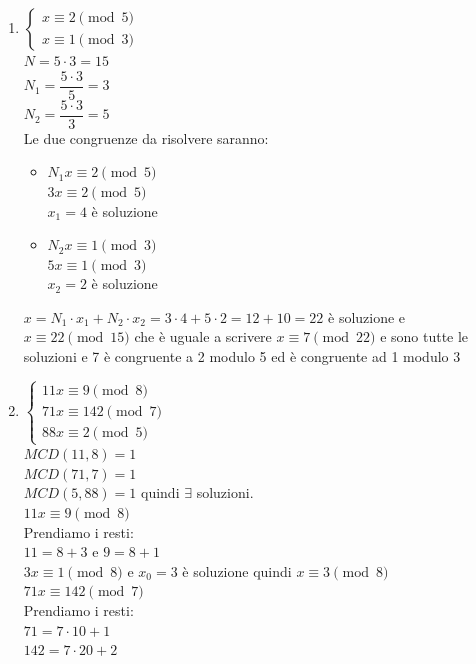 \documentclass[12pt, letterpaper]{report}
\begin{document}
		\begin{enumerate}
			\item $\begin{cases}
				x \equiv 2 \pmod{5} \\
				x \equiv 1 \pmod{3}
			\end{cases}$ \\
			$N = 5 \cdot 3 = 15$ \\
			$N_1 = \dfrac{5 \cdot 3}{5} = 3$ \\
			$N_2 = \dfrac{5 \cdot 3}{3} = 5$ \\
			Le due congruenze da risolvere saranno:
			\begin{itemize}
				\item $N_1x\equiv 2 \pmod{5}$ \\
				$3x \equiv 2 \pmod{5}$ \\
				$x_1 = 4$ è soluzione
				\item $N_2x \equiv 1 \pmod{3}$ \\
				$5x \equiv 1 \pmod{3}$ \\
				$x_2 = 2$ è soluzione
			\end{itemize}
			$x = N_1\cdot x_1 + N_2 \cdot x_2 = 3 \cdot 4 + 5 \cdot 2 = 12 + 10 = 22$ è soluzione e $x \equiv 22 \pmod{15}$ che è uguale a scrivere $x \equiv 7 \pmod{22}$ e sono tutte le soluzioni e 7 è congruente a 2 modulo 5 ed è congruente ad 1 modulo 3
			\item $\begin{cases}
				11x \equiv 9 \pmod{8} \\
				71x \equiv 142 \pmod{7} \\
				88x \equiv 2 \pmod{5}
			\end{cases}$ \\
			$MCD(11, 8) = 1$ \\
			$MCD(71,7) = 1$ \\
			$MCD(5, 88) = 1$ quindi $\exists$ soluzioni. \\
			$11x \equiv 9 \pmod{8}$ \\
			Prendiamo i resti: \\
			$11 = 8 + 3$ e $9 = 8 + 1$ \\
			$3x \equiv 1 \pmod{8}$ e $x_0 = 3$ è soluzione quindi $x \equiv 3 \pmod{8}$ \\
			$71x \equiv 142\pmod{7}$ \\
			Prendiamo i resti: \\
			$71 = 7 \cdot 10 + 1$ \\
			$142 = 7 \cdot 20 + 2$ \\

\end{enumerate}
\end{document}

